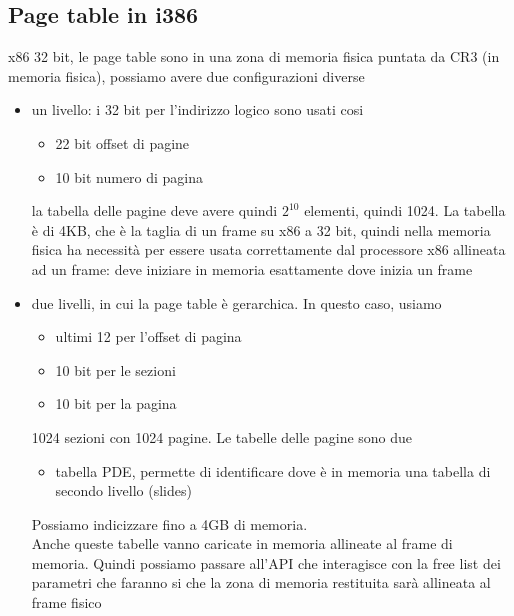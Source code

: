 \documentclass[12pt, oneside]{extbook}
\begin{document}
\subsection{Page table in i386}
x86 32 bit, le page table sono in una zona di memoria fisica puntata da CR3 (in memoria fisica), possiamo avere due configurazioni diverse
\begin{itemize}
\item un livello: i 32 bit per l'indirizzo logico sono usati cosi
\begin{itemize}
\item 22 bit offset di pagine
\item 10 bit numero di pagina
\end{itemize}
la tabella delle pagine deve avere quindi $2^{10}$ elementi, quindi 1024. La tabella è di 4KB, che è la taglia di un frame su x86 a 32 bit, quindi nella memoria fisica ha necessità per essere usata correttamente dal processore x86 allineata ad un frame: deve iniziare in memoria esattamente dove inizia un frame
\item due livelli, in cui la page table è gerarchica. In questo caso, usiamo
\begin{itemize}
\item ultimi 12 per l'offset di pagina
\item 10 bit per le sezioni
\item 10 bit per la pagina
\end{itemize}
1024 sezioni con 1024 pagine. Le tabelle delle pagine sono due
\begin{itemize}
\item tabella PDE, permette di identificare dove è in memoria una tabella di secondo livello
(slides)
\end{itemize}
Possiamo indicizzare fino a 4GB di memoria.\\Anche queste tabelle vanno caricate in memoria allineate al frame di memoria. Quindi possiamo passare all'API che interagisce con la free list dei parametri che faranno si che la zona di memoria restituita sarà allineata al frame fisico
\end{itemize}
\end{document}
